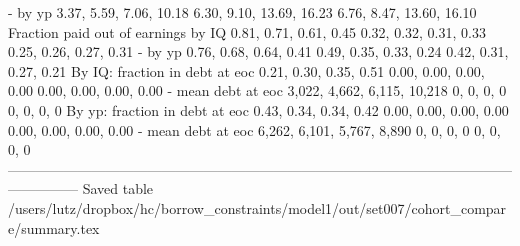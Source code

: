                                - by yp      3.37, 5.59, 7.06, 10.18    6.30, 9.10, 13.69, 16.23    6.76, 8.47, 13.60, 16.10
   Fraction paid out of earnings by IQ       0.81, 0.71, 0.61, 0.45      0.32, 0.32, 0.31, 0.33      0.25, 0.26, 0.27, 0.31
                               - by yp       0.76, 0.68, 0.64, 0.41      0.49, 0.35, 0.33, 0.24      0.42, 0.31, 0.27, 0.21
        By IQ: fraction in debt at eoc       0.21, 0.30, 0.35, 0.51      0.00, 0.00, 0.00, 0.00      0.00, 0.00, 0.00, 0.00
                    - mean debt at eoc  3,022, 4,662, 6,115, 10,218                  0, 0, 0, 0                  0, 0, 0, 0
        By yp: fraction in debt at eoc       0.43, 0.34, 0.34, 0.42      0.00, 0.00, 0.00, 0.00      0.00, 0.00, 0.00, 0.00
                    - mean debt at eoc   6,262, 6,101, 5,767, 8,890                  0, 0, 0, 0                  0, 0, 0, 0
---------------------------------------------------------------------------------------------------------------------------
Saved table  /users/lutz/dropbox/hc/borrow_constraints/model1/out/set007/cohort_compare/summary.tex 
